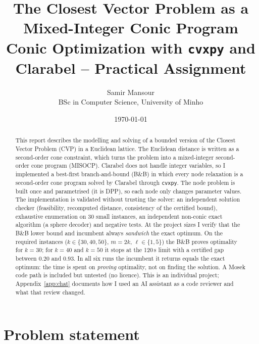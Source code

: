 \documentclass[11pt,a4paper]{article}
\title{\textbf{The Closest Vector Problem as a\\ Mixed-Integer Conic Program}\\[0.4em]
\large Conic Optimization with \texttt{cvxpy} and Clarabel -- Practical Assignment}
\author{Samir Mansour\\
        BSc in Computer Science, University of Minho}
\date{\today}
\newcommand{\BB}{B\&B}
\begin{document}
\maketitle

\begin{abstract}
This report describes the modelling and solving of a bounded version of the Closest Vector Problem (CVP) in a Euclidean lattice. The Euclidean distance is written as a second-order cone constraint, which turns the problem into a mixed-integer second-order cone program (MISOCP). Clarabel does not handle integer variables, so I implemented a best-first branch-and-bound (\BB{}) in which every node relaxation is a second-order cone program solved by Clarabel through \texttt{cvxpy}. The node problem is built once and parametrised (it is DPP), so each node only changes parameter values. The implementation is validated without trusting the solver: an independent solution checker (feasibility, recomputed distance, consistency of the certified bound), exhaustive enumeration on 30 small instances, an independent non-conic exact algorithm (a sphere decoder) and negative tests. At the project sizes I verify that the \BB{} lower bound and incumbent always \emph{sandwich} the exact optimum. On the required instances ($k\in\{30,40,50\}$, $m=2k$, $\ell\in\{1,5\}$) the \BB{} proves optimality for $k=30$; for $k=40$ and $k=50$ it stops at the 120\,s limit with a certified gap between $0.20$ and $0.93$. In all six runs the incumbent it returns equals the exact optimum: the time is spent on \emph{proving} optimality, not on finding the solution. A Mosek code path is included but untested (no licence). This is an individual project; Appendix~\ref{app:chat} documents how I used an AI assistant as a code reviewer and what that review changed.
\end{abstract}

\tableofcontents
\newpage

\section{Problem statement}
\end{document}
